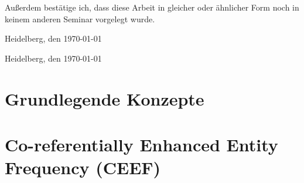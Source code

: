 \documentclass[
     11pt,         %
     a4paper,      %
     oneside,
     ]{article}
\theoremstyle{custm}
\begin{document}
Außerdem bestätige ich, dass diese Arbeit in gleicher oder ähnlicher Form noch in keinem anderen Seminar vorgelegt wurde.
\vspace*{50pt}

Heidelberg, den \today \hspace{2cm} \underline{\phantom{Platz für die Unterschrift}}


Heidelberg, den \today \hspace{2cm} \underline{\phantom{Platz für die Unterschrift}}
\newpage



\tableofcontents
\newpage









\section{Grundlegende Konzepte}







\section{Co-referentially Enhanced Entity Frequency (CEEF)}



\end{document}
